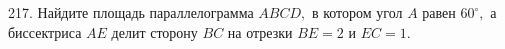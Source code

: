 217. Найдите площадь параллелограмма $ABCD,$ в котором угол $A$ равен $60^\circ,$ а биссектриса $AE$ делит сторону $BC$ на отрезки $BE=2$ и $EC=1.$\\
